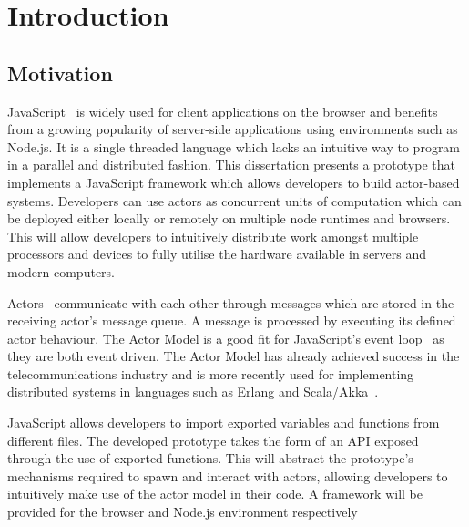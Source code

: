 \documentclass[12pt, a4paper]{report}
\theoremstyle{definition}
\theoremstyle{definition}%
\theoremstyle{definition}%
\theoremstyle{definition}%
\theoremstyle{definition}%
\theoremstyle{definition}%
\begin{document}
\tableofcontents

\listoffigures

\mainmatter

\chapter{Introduction}
\section{Motivation}
JavaScript~\cite{ecmascript} is widely used for client applications on the browser and benefits from a growing popularity of server-side applications using environments such as Node.js. It is a single threaded language which lacks an intuitive way to program in a parallel and distributed fashion. This dissertation presents a prototype that implements a JavaScript framework which allows developers to build actor-based systems. Developers can use actors as concurrent units of computation which can be deployed either locally or remotely on multiple node runtimes and browsers. This will allow developers to intuitively distribute work amongst multiple processors and devices to fully utilise the hardware available in servers and modern computers.

Actors~\cite{hewitt1973session}\cite{43years} communicate with each other through messages which are stored in the receiving actor's message queue. A message is processed by executing its defined actor behaviour. The Actor Model is a good fit for JavaScript's event loop~\cite{eventloopbrowser}\cite{eventloopnode} as they are both event driven. The Actor Model has already achieved success in the telecommunications industry and is more recently used for implementing distributed systems in languages such as Erlang and Scala/Akka~\cite{haller2012integration}.

JavaScript allows developers to import exported variables and functions from different files. The developed prototype takes the form of an API exposed through the use of exported functions. This will abstract the prototype's mechanisms required to spawn and interact with actors, allowing developers to intuitively make use of the actor model in their code. A framework will be provided for the browser and Node.js environment respectively
\end{document}
